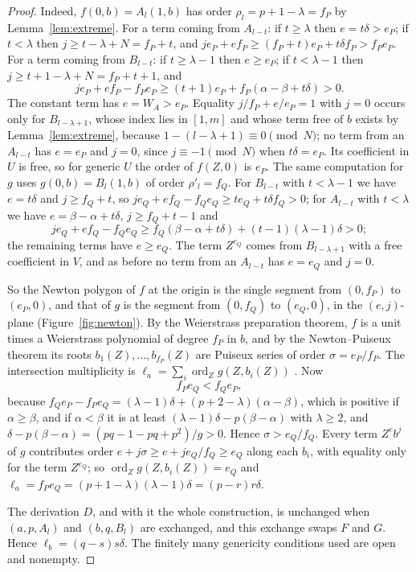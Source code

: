 \documentclass[11pt]{amsart}
\theoremstyle{definition}
\theoremstyle{remark}
\numberwithin{equation}{section}
\DeclareMathOperator{\ord}{ord}
\begin{document}
\begin{proof}
Indeed, $f(0,b)=A_l(1,b)$ has order $\rho_l=p+1-\lambda=f_P$ by Lemma~\ref{lem:extreme}. For a term coming from $A_{l-t}$: if $t\ge\lambda$ then $e=t\delta>e_P$; if $t<\lambda$ then $j\ge t-\lambda+N=f_P+t$, and $j e_P+e f_P\ge(f_P+t)e_P+t\delta f_P>f_Pe_P$. For a term coming from $B_{l-t}$: if $t\ge\lambda-1$ then $e\ge e_P$; if $t<\lambda-1$ then $j\ge t+1-\lambda+N=f_P+t+1$, and
\[
je_P+ef_P-f_Pe_P\ge(t+1)e_P+f_P(\alpha-\beta+t\delta)>0 .
\]
The constant term has $e=W_A>e_P$. Equality $j/f_P+e/e_P=1$ with $j=0$ occurs only for $B_{l-\lambda+1}$, whose index lies in $[1,m]$ and whose term free of $b$ exists by Lemma~\ref{lem:extreme}, because $1-(l-\lambda+1)\equiv0\pmod N$; no term from an $A_{l-t}$ has $e=e_P$ and $j=0$, since $j\equiv-1\pmod N$ when $t\delta=e_P$. Its coefficient in $U$ is free, so for generic $U$ the order of $f(Z,0)$ is $e_P$. The same computation for $g$ uses $g(0,b)=B_l(1,b)$ of order $\rho'_l=f_Q$. For $B_{l-t}$ with $t<\lambda-1$ we have $e=t\delta$ and $j\ge f_Q+t$, so $je_Q+ef_Q-f_Qe_Q\ge te_Q+t\delta f_Q>0$; for $A_{l-t}$ with $t<\lambda$ we have $e=\beta-\alpha+t\delta$, $j\ge f_Q+t-1$ and
\[
je_Q+ef_Q-f_Qe_Q\ge f_Q(\beta-\alpha+t\delta)+(t-1)(\lambda-1)\delta>0;
\]
the remaining terms have $e\ge e_Q$. The term $Z^{e_Q}$ comes from $B_{l-\lambda+1}$ with a free coefficient in $V$, and as before no term from an $A_{l-t}$ has $e=e_Q$ and $j=0$.

So the Newton polygon of $f$ at the origin is the single segment from $(0,f_P)$ to $(e_P,0)$, and that of $g$ is the segment from $(0,f_Q)$ to $(e_Q,0)$, in the $(e,j)$-plane (Figure~\ref{fig:newton}). By the Weierstrass preparation theorem, $f$ is a unit times a Weierstrass polynomial of degree $f_P$ in $b$, and by the Newton--Puiseux theorem its roots $b_1(Z),\dots,b_{f_P}(Z)$ are Puiseux series of order $\sigma=e_P/f_P$. The intersection multiplicity is $\ell_a=\sum_i\ord_Zg(Z,b_i(Z))$ \cite[Sections~1.2 and~2.6]{CA00}. Now
\[
f_Pe_Q<f_Qe_P,
\]
because $f_Qe_P-f_Pe_Q=(\lambda-1)\delta+(p+2-\lambda)(\alpha-\beta)$, which is positive if $\alpha\ge\beta$, and if $\alpha<\beta$ it is at least $(\lambda-1)\delta-p(\beta-\alpha)$ with $\lambda\ge2$, and $\delta-p(\beta-\alpha)=(pq-1-pq+p^2)/g>0$. Hence $\sigma>e_Q/f_Q$. Every term $Z^eb^j$ of $g$ contributes order $e+j\sigma\ge e+je_Q/f_Q\ge e_Q$ along each $b_i$, with equality only for the term $Z^{e_Q}$; so $\ord_Zg(Z,b_i(Z))=e_Q$ and $\ell_a=f_Pe_Q=(p+1-\lambda)(\lambda-1)\delta=(p-r)r\delta$.

The derivation $D$, and with it the whole construction, is unchanged when $(a,p,A_l)$ and $(b,q,B_l)$ are exchanged, and this exchange swaps $F$ and $G$. Hence $\ell_b=(q-s)s\delta$. The finitely many genericity conditions used are open and nonempty.
\end{proof}
\end{document}
